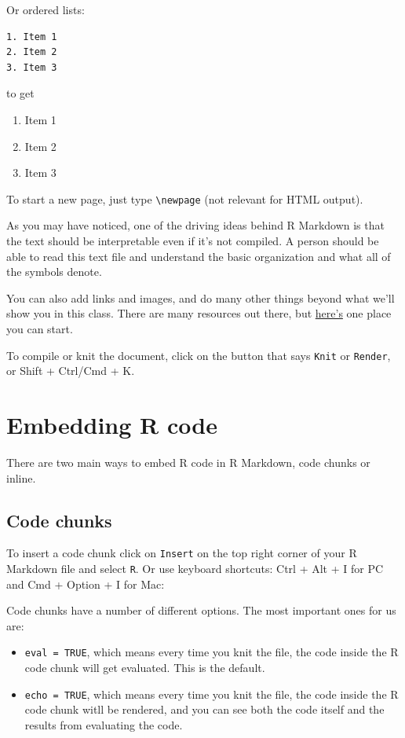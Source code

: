 \documentclass[
  letterpaper,
  DIV=11,
  numbers=noendperiod]{scrreprt}
\providecommand{\tightlist}{%
  \setlength{\itemsep}{0pt}\setlength{\parskip}{0pt}}\usepackage{longtable,booktabs,array}
\begin{document}
Or ordered lists:

\begin{verbatim}
1. Item 1
2. Item 2
3. Item 3
\end{verbatim}

to get

\begin{enumerate}
\def\labelenumi{\arabic{enumi}.}
\tightlist
\item
  Item 1
\item
  Item 2
\item
  Item 3
\end{enumerate}

To start a new page, just type \texttt{\textbackslash{}newpage} (not
relevant for HTML output).

As you may have noticed, one of the driving ideas behind R Markdown is
that the text should be interpretable even if it's not compiled. A
person should be able to read this text file and understand the basic
organization and what all of the symbols denote.

You can also add links and images, and do many other things beyond what
we'll show you in this class. There are many resources out there, but
\href{https://rmarkdown.rstudio.com/lesson-1.html}{here's} one place you
can start.

To compile or knit the document, click on the button that says
\texttt{Knit} or \texttt{Render}, or Shift + Ctrl/Cmd + K.

\hypertarget{embedding-r-code}{%
\section{Embedding R code}\label{embedding-r-code}}

There are two main ways to embed R code in R Markdown, code chunks or
inline.

\hypertarget{code-chunks}{%
\subsection{Code chunks}\label{code-chunks}}

To insert a code chunk click on \texttt{Insert} on the top right corner
of your R Markdown file and select \texttt{R}. Or use keyboard
shortcuts: Ctrl + Alt + I for PC and Cmd + Option + I for Mac:

Code chunks have a number of different options. The most important ones
for us are:

\begin{itemize}
\tightlist
\item
  \texttt{eval\ =\ TRUE}, which means every time you knit the file, the
  code inside the R code chunk will get evaluated. This is the default.
\item
  \texttt{echo\ =\ TRUE}, which means every time you knit the file, the
  code inside the R code chunk witll be rendered, and you can see both
  the code itself and the results from evaluating the code.
\end{itemize}
\end{document}
